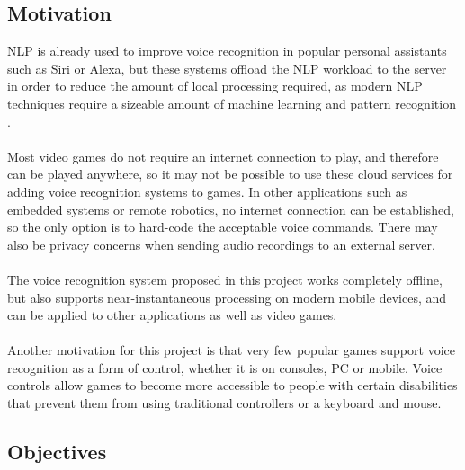 \documentclass[11pt]{article}
\begin{document}
\subsection{Motivation}

NLP is already used to improve voice recognition in popular personal assistants such as Siri or Alexa, but these systems offload the NLP workload to the server in order to reduce the amount of local processing required, as modern NLP techniques require a sizeable amount of machine learning and pattern recognition \cite{RefWorks:21}.
\\
\\
Most video games do not require an internet connection to play, and therefore can be played anywhere, so it may not be possible to use these cloud services for adding voice recognition systems to games. In other applications such as embedded systems or remote robotics, no internet connection can be established, so the only option is to hard-code the acceptable voice commands. There may also be privacy concerns when sending audio recordings to an external server.
\\
\\
The voice recognition system proposed in this project works completely offline, but also supports near-instantaneous processing on modern mobile devices, and can be applied to other applications as well as video games.
\\
\\
Another motivation for this project is that very few popular games support voice recognition as a form of control, whether it is on consoles, PC or mobile. Voice controls allow games to become more accessible to people with certain disabilities that prevent them from using traditional controllers or a keyboard and mouse.

\subsection{Objectives}
\end{document}
